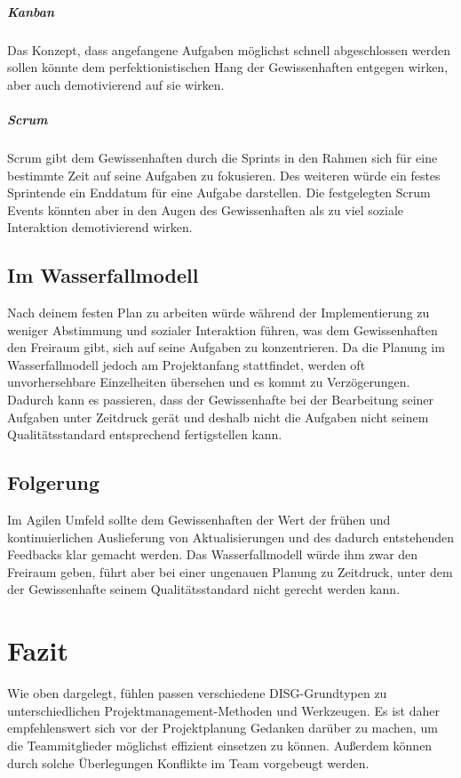 \documentclass[twocolumn,10pt]{asme2ej}
\begin{document}
\subparagraph{Kanban}
Das Konzept, dass angefangene Aufgaben möglichst schnell abgeschlossen werden sollen könnte dem perfektionistischen Hang der Gewissenhaften entgegen wirken, aber auch demotivierend auf sie wirken.

\subparagraph{Scrum}
Scrum gibt dem Gewissenhaften durch die Sprints in den Rahmen sich für eine bestimmte Zeit auf seine Aufgaben zu fokusieren. Des weiteren würde ein festes Sprintende ein Enddatum für eine Aufgabe darstellen. Die festgelegten Scrum Events könnten aber in den Augen des Gewissenhaften als zu viel soziale Interaktion demotivierend wirken.

\subsection{Im Wasserfallmodell}
Nach deinem festen Plan zu arbeiten würde während der Implementierung zu weniger Abstimmung und sozialer Interaktion führen, was dem Gewissenhaften den Freiraum gibt, sich auf seine Aufgaben zu konzentrieren. Da die Planung im Wasserfallmodell jedoch am Projektanfang stattfindet, werden oft unvorhersehbare Einzelheiten übersehen und es kommt zu Verzögerungen. Dadurch kann es passieren, dass der Gewissenhafte bei der Bearbeitung seiner Aufgaben unter Zeitdruck gerät und deshalb nicht die Aufgaben nicht seinem Qualitätsstandard entsprechend fertigstellen kann.

\subsection{Folgerung}
Im Agilen Umfeld sollte dem Gewissenhaften der Wert der frühen und kontinuierlichen Auslieferung von Aktualisierungen und des dadurch entstehenden Feedbacks klar gemacht werden. Das Wasserfallmodell würde ihm zwar den Freiraum geben, führt aber bei einer ungenauen Planung zu Zeitdruck, unter dem der Gewissenhafte seinem Qualitätsstandard nicht gerecht werden kann.

\cite{disc_pm}
\section{Fazit}\label{sec:3}

Wie oben dargelegt, fühlen passen verschiedene DISG-Grundtypen zu unterschiedlichen Projektmanagement-Methoden und Werkzeugen. Es ist daher empfehlenswert sich vor der Projektplanung Gedanken darüber zu machen, um die Teammitglieder möglichst effizient einsetzen zu können. Außerdem können durch solche Überlegungen Konflikte im Team vorgebeugt werden. 
\end{document}
